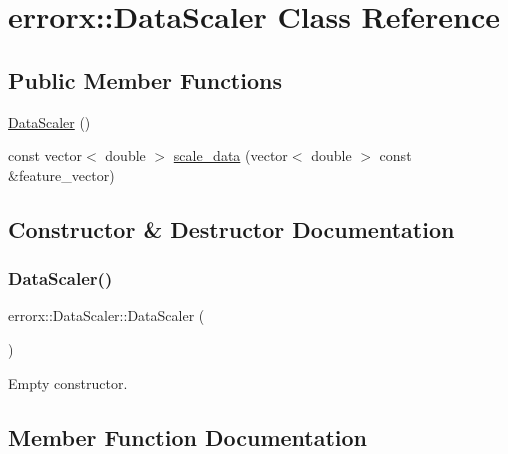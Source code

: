 \hypertarget{classerrorx_1_1_data_scaler}{}\section{errorx\+:\+:Data\+Scaler Class Reference}
\label{classerrorx_1_1_data_scaler}
\subsection*{Public Member Functions}
\begin{DoxyCompactItemize}
\item 
\mbox{\hyperlink{classerrorx_1_1_data_scaler_a6a66ab7af20eea46b02f4e193584a038}{Data\+Scaler}} ()
\item 
const vector$<$ double $>$ \mbox{\hyperlink{classerrorx_1_1_data_scaler_accef2aca058fcfdcc27d83dd70a5082d}{scale\+\_\+data}} (vector$<$ double $>$ const \&feature\+\_\+vector)
\end{DoxyCompactItemize}


\subsection{Constructor \& Destructor Documentation}
\mbox{\label{classerrorx_1_1_data_scaler_a6a66ab7af20eea46b02f4e193584a038}} 
\subsubsection{\texorpdfstring{Data\+Scaler()}{DataScaler()}}
{\footnotesize\ttfamily errorx\+::\+Data\+Scaler\+::\+Data\+Scaler (\begin{DoxyParamCaption}{ }\end{DoxyParamCaption})}

Empty constructor. 

\subsection{Member Function Documentation}
\mbox{\label{classerrorx_1_1_data_scaler_accef2aca058fcfdcc27d83dd70a5082d}} 
